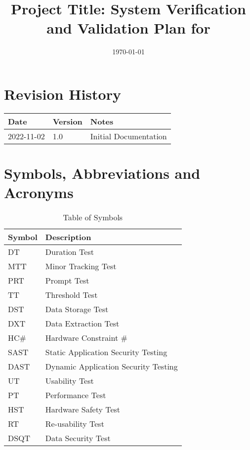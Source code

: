 \documentclass[12pt, titlepage]{article}
\begin{document}
\title{Project Title: System Verification and Validation Plan for \progname{}}
\author{\authname}
\date{\today}

\maketitle


\section{Revision History}

\begin{tabularx}{\textwidth}{p{3cm}p{2cm}X}

  \toprule {\bf Date} & {\bf Version} & {\bf Notes}           \\
  \midrule
  2022-11-02          & 1.0           & Initial Documentation \\
  \bottomrule
\end{tabularx}

\newpage

\tableofcontents

\listoftables
{}


\newpage

\section{Symbols, Abbreviations and Acronyms}
\renewcommand{\arraystretch}{1.2}

\begin{table}[H]
	\begin{tabular}{l l} 
		  \toprule		
			  \textbf{Symbol} & \textbf{Description}\\
			  \midrule 
			  DT 						& Duration Test\\
			  MTT 					& Minor Tracking Test\\
			  PRT 					& Prompt Test\\
			  TT 						& Threshold Test\\
			  DST 					& Data Storage Test\\
			  DXT 					& Data Extraction Test\\
			  HC\#					& Hardware Constraint \#\\ 
			  SAST					& Static Application Security Testing\\			
			  DAST					& Dynamic Application Security Testing\\
			  UT						& Usability Test\\
			  PT						& Performance Test\\
			  HST					& Hardware Safety Test\\
			  RT						& Re-usability Test\\
			  DSQT					& Data Security Test\\
		  \bottomrule
	\end{tabular}\\\\
\caption{\label{Syb}Table of Symbols}
\end{table}
\end{document}
